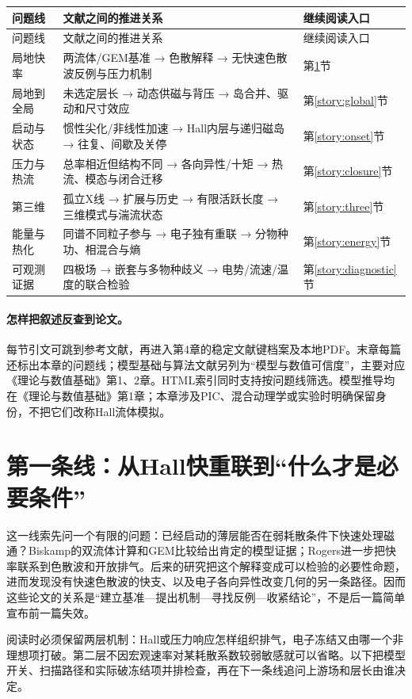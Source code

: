 \documentclass[UTF8,a4paper,11pt,openany,fontset=fandol]{ctexbook}
\begin{document}
\begin{longtable}{P{24mm}P{85mm}P{38mm}}
\toprule 问题线 & 文献之间的推进关系 & 继续阅读入口\\\midrule\endfirsthead
\toprule 问题线 & 文献之间的推进关系 & 继续阅读入口\\\midrule\endhead
局地快率 & 两流体/GEM基准 → 色散解释 → 无快速色散波反例与压力机制 & 第\ref{story:fast}节\\
局地到全局 & 未选定层长 → 动态供磁与背压 → 岛合并、驱动和尺寸效应 & 第\ref{story:global}节\\
启动与状态 & 惯性尖化/非线性加速 → Hall内层与递归磁岛 → 往复、间歇及关停 & 第\ref{story:onset}节\\
压力与热流 & 总率相近但结构不同 → 各向异性/十矩 → 热流、模态与闭合迁移 & 第\ref{story:closure}节\\
第三维 & 孤立X线 → 扩展与历史 → 有限活跃长度 → 三维模式与湍流状态 & 第\ref{story:three}节\\
能量与热化 & 同谱不同粒子参与 → 电子独有重联 → 分物种功、相混合与熵 & 第\ref{story:energy}节\\
可观测证据 & 四极场 → 嵌套与多物种歧义 → 电势/流速/温度的联合检验 & 第\ref{story:diagnostic}节\\
\bottomrule
\end{longtable}

\paragraph{怎样把叙述反查到论文。}
每节引文可跳到参考文献，再进入第4章的稳定文献键档案及本地PDF。末章每篇还标出本章的问题线；模型基础与算法文献另列为“模型与数值可信度”，主要对应《理论与数值基础》第1、2章。HTML索引同时支持按问题线筛选。模型推导均在《理论与数值基础》第1章；本章涉及PIC、混合动理学或实验时明确保留身份，不把它们改称Hall流体模拟。

\section{第一条线：从Hall快重联到“什么才是必要条件”}\label{story:fast}
这一线索先问一个有限的问题：已经启动的薄层能否在弱耗散条件下快速处理磁通？Biskamp的双流体计算和GEM比较给出肯定的模型证据；Rogers进一步把快率联系到色散波和开放排气。后来的研究把这个解释变成可以检验的必要性命题，进而发现没有快速色散波的快支、以及电子各向异性改变几何的另一条路径。因而这些论文的关系是“建立基准—提出机制—寻找反例—收紧结论”，不是后一篇简单宣布前一篇失效。

阅读时必须保留两层机制：Hall或压力响应怎样组织排气，电子冻结又由哪一个非理想项打破。第二层不因宏观速率对某耗散系数较弱敏感就可以省略。以下把模型开关、扫描路径和实际破冻结项并排检查，再在下一条线追问上游场和层长由谁决定。
\end{document}
